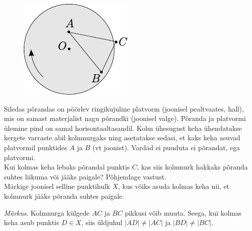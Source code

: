 \documentclass[10pt, twoside]{article}
\begin{document}
{
\begin{figure}
	\begin{center}
		\vspace{-20pt}
		\includegraphics[width=\linewidth]{2005-v3g-10-yl}
	\end{center}
\end{figure}
Siledas põrandas on pöörlev ringikujuline platvorm (joonisel pealtvaates, hall), mis on samast materjalist nagu põrandki (joonisel valge). Põranda ja platvormi ülemine pind on samal horisontaaltasandil. Kolm ühesugust keha ühendatakse kergete varraste abil kolmnurgaks ning asetatakse sedasi, et kaks keha asuvad platvormil punktides $A$ ja $B$ (vt joonist). Vardad ei puuduta ei põrandat, ega platvormi.\\
\osa Kui kolmas keha lebaks põrandal punktis $C$, kas siis kolmnurk hakkaks põranda suhtes liikuma või jääks paigale? Põhjendage vastust.\\
\osa Märkige joonisel selline punktihulk $X$, kus võiks asuda kolmas keha nii, et kolmnurk jääks põranda suhtes paigale.

\emph{Märkus}. Kolmnurga külgede $AC$ ja $BC$ pikkusi võib muuta. Seega, kui kolmas keha asub punktis $D \in X$, siis üldjuhul $|AD| \neq |AC|$ ja $|BD| \neq |BC|$.
\probend
\bigskip
\newpage\subsection{\protect{}}

}
\end{document}
